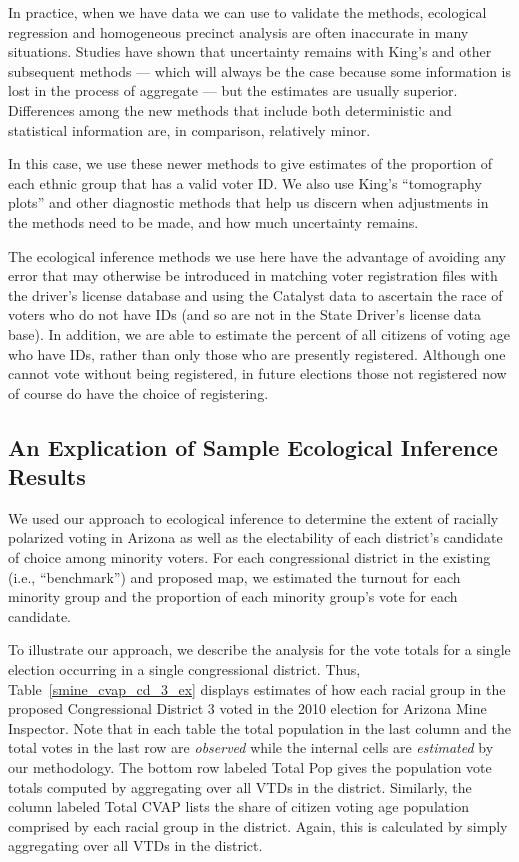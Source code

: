 \documentclass[12pt]{article}
\begin{document}
In practice, when we have data we can use to validate the methods,
ecological regression and homogeneous precinct analysis are often
inaccurate in many situations. Studies have shown that uncertainty
remains with King's and other subsequent methods --- which will always
be the case because some information is lost in the process of
aggregate --- but the estimates are usually superior. Differences
among the new methods that include both deterministic and statistical
information are, in comparison, relatively minor.

In this case, we use these newer methods to give estimates of the
proportion of each ethnic group that has a valid voter ID.  We also
use King's ``tomography plots'' and other diagnostic methods that help
us discern when adjustments in the methods need to be made, and how
much uncertainty remains.

The ecological inference methods we use here have the advantage of
avoiding any error that may otherwise be introduced in matching voter
registration files with the driver's license database and using the
Catalyst data to ascertain the race of voters who do not have IDs (and
so are not in the State Driver's license data base).  In addition, we
are able to estimate the percent of all citizens of voting age who
have IDs, rather than only those who are presently registered.
Although one cannot vote without being registered, in future elections
those not registered now of course do have the choice of registering.

\subsection{An Explication of Sample Ecological Inference Results}

We used our approach to ecological inference to determine the extent
of racially polarized voting in Arizona as well as the electability of
each district's candidate of choice among minority voters. For each
congressional district in the existing (i.e., ``benchmark'') and
proposed map, we estimated the turnout for each minority group and the
proportion of each minority group's vote for each candidate. 

To illustrate our approach, we describe the analysis for the vote
totals for a single election occurring in a single congressional
district.  Thus, Table~\ref{smine_cvap_cd_3_ex} displays estimates of
how each racial group in the proposed Congressional District 3 voted
in the 2010 election for Arizona Mine Inspector. Note that in each
table the total population in the last column and the total votes in
the last row are {\it observed} while the internal cells are {\it estimated} 
by our methodology. The bottom row labeled Total Pop
gives the population vote totals computed by aggregating over all VTDs
in the district.  Similarly, the column labeled Total CVAP lists the
share of citizen voting age population comprised by each racial group
in the district.  Again, this is calculated by simply aggregating over
all VTDs in the district.
\end{document}
